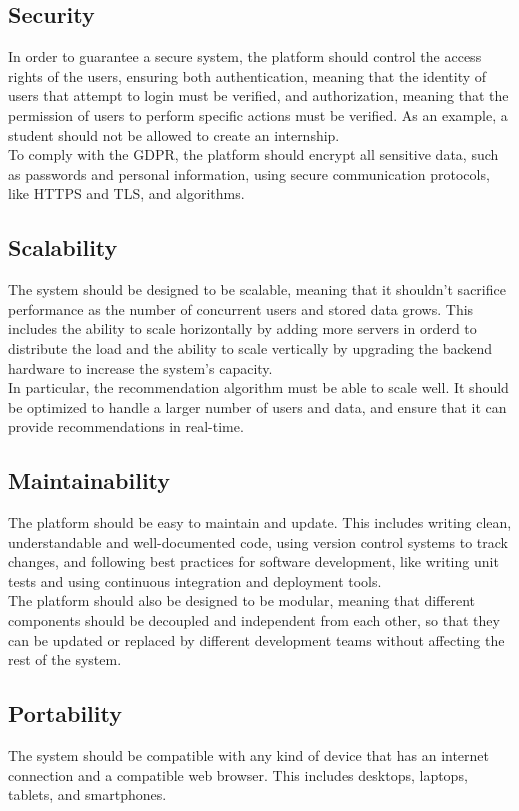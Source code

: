 \subsection{Security}
In order to guarantee a secure system, the platform should control the access rights of the users, ensuring both authentication, meaning that 
the identity of users that attempt to login must be verified, and authorization, meaning that the permission of users to perform specific actions
must be verified. As an example, a student should not be allowed to create an internship. \\
To comply with the GDPR, the platform should encrypt all sensitive data, such as passwords and personal information, using secure communication protocols, 
like HTTPS and TLS, and algorithms.

\subsection{Scalability}
The system should be designed to be scalable, meaning that it shouldn't sacrifice performance as the number of concurrent users and stored data grows.
This includes the ability to scale horizontally by adding more servers in orderd to distribute the load and the ability to scale vertically by upgrading 
the backend hardware to increase the system's capacity. \\
In particular, the recommendation algorithm must be able to scale well. It should be optimized to handle a larger number of users and data, and ensure
that it can provide recommendations in real-time.

\subsection{Maintainability}
The platform should be easy to maintain and update. This includes writing clean, understandable and well-documented code, using version control systems 
to track changes, and following best practices for software development, like writing unit tests and using continuous integration and deployment tools. \\
The platform should also be designed to be modular, meaning that different components should be decoupled and independent from each other, so that
they can be updated or replaced by different development teams without affecting the rest of the system.

\subsection{Portability}
The system should be compatible with any kind of device that has an internet connection and a compatible web browser. This includes desktops, laptops,
tablets, and smartphones.